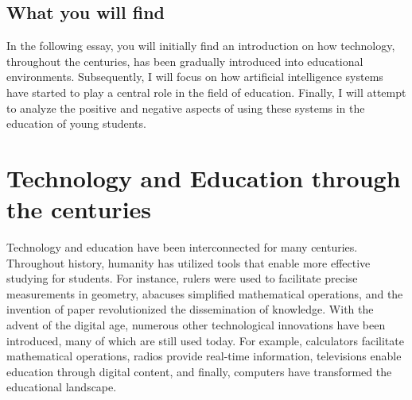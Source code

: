 \documentclass[a4paper,12pt]{article}
\begin{document}
\subsection{What you will find}
In the following essay, you will initially find an introduction on how technology, throughout the centuries, has been gradually introduced into educational environments. Subsequently, I will focus on how artificial intelligence systems have started to play a central role in the field of education. Finally, I will attempt to analyze the positive and negative aspects of using these systems in the education of young students.
\begin{comment}
Nel seguente elaborato troverai inizialmente un'introduzione su come la tecnologia, attraverso i secoli, sia stata gradualmente introdotta negli ambienti educativi, successivamente mi concentrerò su come i sistemi di intelligenza artificiale hanno iniziato ad avere un ruolo centrale in ambito educazionale ed infine  cercherò di analizzare i lati positivi e negativi dell'uso di questi sistemi nell'educazione dei giovani ragazzi.
\end{comment}


\section{Technology and Education through the centuries}
Technology and education have been interconnected for many centuries. Throughout history, humanity has utilized tools that enable more effective studying for students. For instance, rulers were used to facilitate precise measurements in geometry, abacuses simplified mathematical operations, and the invention of paper revolutionized the dissemination of knowledge. With the advent of the digital age, numerous other technological innovations have been introduced, many of which are still used today. For example, calculators facilitate mathematical operations, radios provide real-time information, televisions enable education through digital content, and finally, computers have transformed the educational landscape.

\begin{comment}
    Tecnologia ed educazione sono legati ormai da molti secoli. 
    L'umanità ha sempre usato strumenti che permettevano allo studente di studiare in maniera più efficace. 
    Si pensi per esempio ai righelli che permettevano di fare misurazioni più efficaci nella materia della geometria, agli abachi che semplificavano le operazioni matematiche, all'invenzione della carta etc. 
    Con l'avvento del digitale sono state introdotte moltre altre innovazioni tecnologiche molte delle quali vengono usate anche ai nostri giorni. 
    Per esempio: la calcolatrice che permette di fare operazioni matematiche, la radio che permette l'informazione in tempo reale, la televione che permette l'educazione attraverso contenuti digitali ed infine il computer.
\end{comment}
\end{document}
